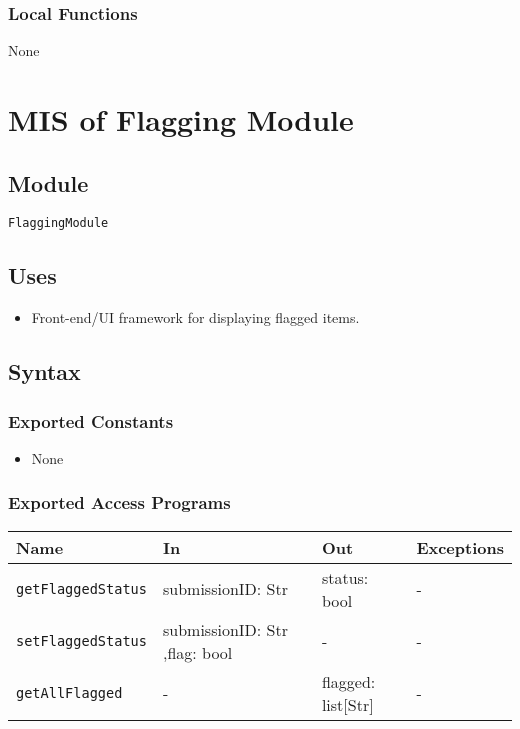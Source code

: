 \documentclass[12pt, titlepage]{article}
\begin{document}
\begin{itemize}
\subsubsection{Local Functions}

\begin{itemize}
None
\end{itemize}


\section{MIS of Flagging Module} \label{mFlagging}

\subsection{Module}

\texttt{FlaggingModule}

\subsection{Uses}

\begin{itemize}
    \item Front-end/UI framework for displaying flagged items.
\end{itemize}

\subsection{Syntax}

\subsubsection{Exported Constants}

\begin{itemize}
    \item None
\end{itemize}

\subsubsection{Exported Access Programs}

\begin{center}
\begin{tabular}{p{5cm} p{3.5cm} p{3.5cm} p{2cm}}
\hline
\textbf{Name} & \textbf{In} & \textbf{Out} & \textbf{Exceptions} \\
\hline
\texttt{getFlaggedStatus} & submissionID: Str & status: bool & - \\
\texttt{setFlaggedStatus} & submissionID: Str ,flag: bool & - & - \\
\texttt{getAllFlagged} & - & flagged: list[Str] & - \\
\hline
\end{tabular}
\end{center}


\end{itemize}
\end{document}
